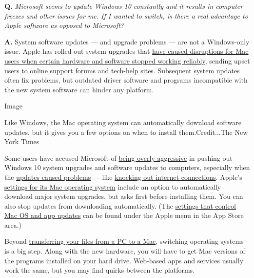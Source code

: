 \textbf{Q.} \emph{Microsoft seems to update Windows 10 constantly and it
results in computer freezes and other issues for me. If I wanted to
switch, is there a real advantage to Apple software as opposed to
Microsoft?}

\textbf{A.} System software updates --- and upgrade problems --- are not
a Windows-only issue. Apple has rolled out system upgrades that
\href{http://www.gottabemobile.com/common-os-x-el-capitan-problems-fixes/}{have
caused disruptions for Mac users when certain hardware and software
stopped working reliably}, sending upset users to
\href{https://discussions.apple.com/community/mac_os}{online support
forums} and
\href{http://osxdaily.com/2016/09/24/troubleshooting-macos-sierra-problems/}{tech-help
sites}. Subsequent system updates often fix problems, but outdated
driver software and programs incompatible with the new system software
can hinder any platform.

Image

Like Windows, the Mac operating system can automatically download
software updates, but it gives you a few options on when to install
them.Credit...The New York Times

Some users have accused Microsoft of
\href{http://www.computerworld.com/article/3030564/microsoft-windows/microsoft-uses-the-force-you-will-upgrade-to-windows-10.html}{being
overly aggressive} in pushing out Windows 10 system upgrades and
software updates to computers, especially when the
\href{https://www.thurrott.com/windows/windows-10/81659/microsoft-delivers-yet-another-broken-windows-10-update}{updates
caused problems} --- like
\href{http://www.digitaltrends.com/computing/microsoft-kb3206632-fixes-network-connectivity-problem/}{knocking
out internet connections}. Apple's
\href{https://support.apple.com/en-us/HT201475}{settings for its Mac
operating system} include an option to automatically download major
system upgrades, but asks first before installing them. You can also
stop updates from downloading automatically. (The
\href{https://support.apple.com/en-us/HT201541}{settings that control
Mac OS and app updates} can be found under the Apple menu in the App
Store area.)

Beyond \href{https://support.apple.com/en-us/HT204087}{transferring your
files from a PC to a Mac}, switching operating systems is a big step.
Along with the new hardware, you will have to get Mac versions of the
programs installed on your hard drive. Web-based apps and services
usually work the same, but you may find quirks between the platforms.

